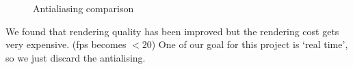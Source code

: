 \documentclass[a4paper]{article}
\begin{document}
\begin{figure}[H]
\centering
{}
\caption[1]{Antialiasing comparison}
\end{figure}
We found that rendering quality has been improved but the rendering cost gets very expensive. (fps becomes $<20$)
One of our goal for this project is `real time', so we just discard the antialising.
\end{document}
